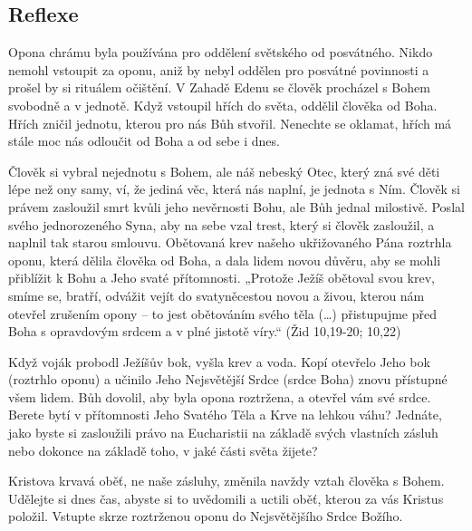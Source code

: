 \documentclass[11pt]{article}
\begin{document}
\subsection*{Reflexe}
Opona chrámu byla používána pro oddělení světského od posvátného. Nikdo nemohl vstoupit za oponu, aniž by nebyl
oddělen pro posvátné povinnosti a prošel by si rituálem očištění. V Zahadě Edenu se člověk procházel s Bohem
svobodně a v jednotě. Když vstoupil hřích do světa, oddělil člověka od Boha. Hřích zničil jednotu, kterou pro nás Bůh
stvořil. Nenechte se oklamat, hřích má stále moc nás odloučit od Boha a od sebe i dnes.

Člověk si vybral nejednotu s Bohem, ale náš nebeský Otec, který zná své děti lépe než ony samy, ví, že jediná věc,
která nás naplní, je jednota s Ním. Člověk si právem zasloužil smrt kvůli jeho nevěrnosti Bohu, ale Bůh jednal
milostivě. Poslal svého jednorozeného Syna, aby na sebe vzal trest, který si člověk zasloužil, a naplnil tak starou
smlouvu. Obětovaná krev našeho ukřižovaného Pána roztrhla oponu, která dělila člověka od Boha, a dala lidem novou
důvěru, aby se mohli přiblížit k Bohu a Jeho svaté přítomnosti. „Protože Ježíš obětoval svou krev, smíme se, bratří,
odvážit vejít do svatyněcestou novou a živou, kterou nám otevřel zrušením opony – to jest obětováním svého těla (…)
přistupujme před Boha s opravdovým srdcem a v plné jistotě víry.“ (Žid 10,19-20; 10,22)

Když voják probodl Ježíšův bok, vyšla krev a voda. Kopí otevřelo Jeho bok (roztrhlo oponu) a učinilo Jeho Nejsvětější
Srdce (srdce Boha) znovu přístupné všem lidem. Bůh dovolil, aby byla opona roztržena, a otevřel vám své srdce.
Berete bytí v přítomnosti Jeho Svatého Těla a Krve na lehkou váhu? Jednáte, jako byste si zasloužili právo na
Eucharistii na základě svých vlastních zásluh nebo dokonce na základě toho, v jaké části světa žijete?

Kristova krvavá oběť, ne naše zásluhy, změnila navždy vztah člověka s Bohem. Udělejte si dnes čas, abyste si to
uvědomili a uctili oběť, kterou za vás Kristus položil. Vstupte skrze roztrženou oponu do Nejsvětějšího Srdce Božího.
\end{document}
